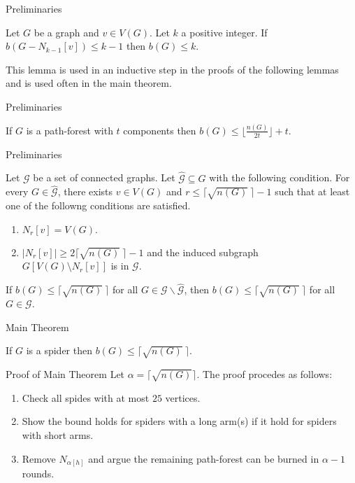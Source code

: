 \documentclass{beamer}
\begin{document}
\begin{frame}{Preliminaries}
    \begin{lemma}
        Let $G$ be a graph and $v \in V(G)$. Let $k$ a positive integer.
        If $b(G - N_{k-1}[v]) \leq k - 1$ then $b(G) \leq k$.
    \end{lemma}

    This lemma is used in an inductive step in the proofs of the following lemmas and is used often in the main theorem.
\end{frame}

\begin{frame}{Preliminaries}
    \begin{lemma}
        If $G$ is a path-forest with $t$ components then $b(G) \leq \lfloor \frac{n(G)}{2t} \rfloor + t$.
    \end{lemma}
\end{frame}

\begin{frame}{Preliminaries}
    \begin{lemma}
        Let $\mathcal{G}$ be a set of connected graphs.
        Let $\hat{\mathcal{G}} \subseteq G$ with the following condition.
        For every $G \in \hat{\mathcal{G}}$, there exists $v \in V(G)$ and $r \leq \lceil \sqrt{n(G)}\ \rceil - 1$ such that at least one of the followng conditions are satisfied.
        \begin{enumerate}
            \item $N_r[v] = V(G).$
            \item $|N_r[v]| \geq 2\lceil \sqrt{n(G)}\ \rceil - 1$ and the induced subgraph\\ $G[V(G) \setminus N_r[v]]$ is in  $\mathcal{G}$.
        \end{enumerate}
        If $b(G) \leq \lceil \sqrt{n(G)}\ \rceil$ for all $G \in \mathcal{G} \backslash \hat{\mathcal{G}}$, then $b(G) \leq \lceil \sqrt{n(G)}\ \rceil$ for all $G \in \mathcal{G}$.
    \end{lemma}
\end{frame}

\begin{frame}{Main Theorem}
    \begin{theorem}
        If $G$ is a spider then $b(G) \leq \lceil \sqrt{n(G)}\ \rceil$.
    \end{theorem}
\end{frame}

\begin{frame}{Proof of Main Theorem}
    Let $\alpha = \lceil \sqrt{n(G)} \rceil$.
    The proof procedes as follows:
    \begin{enumerate}
        \item Check all spides with at most $25$ vertices.
        \item Show the bound holds for spiders with a long arm(s) if it hold for spiders with short arms.
        \item Remove $N_{\alpha[h]}$ and argue the remaining path-forest can be burned in $\alpha - 1$ rounds.
    \end{enumerate}
\end{frame}
\end{document}
